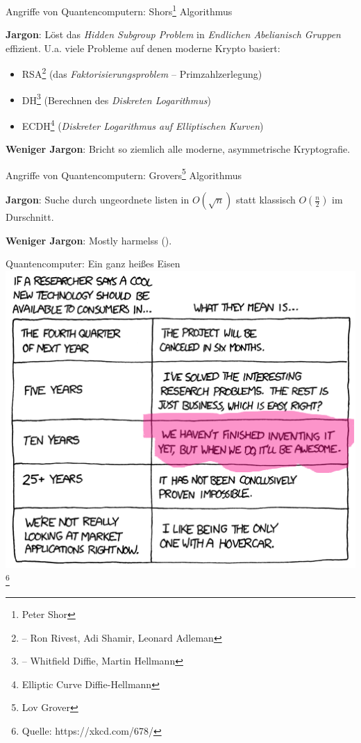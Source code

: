 \documentclass{rosenpass-beamer}
\begin{document}
\begin{frame}{Angriffe von Quantencomputern: Shors\footnote{Peter Shor} Algorithmus}

\textbf{Jargon}: Löst das \emph{Hidden Subgroup Problem} in \emph{Endlichen Abelianisch Gruppen} effizient. U.a. viele Probleme auf denen moderne Krypto basiert:

\vspace{5mm}

\begin{itemize}
    \item RSA\footnote{ -- Ron Rivest, Adi Shamir, Leonard Adleman} (das \emph{Faktorisierungsproblem} – Primzahlzerlegung)
    \item DH\footnote{ -- Whitfield Diffie, Martin Hellmann} (Berechnen des \emph{Diskreten Logarithmus})
    \item ECDH\footnote{Elliptic Curve Diffie-Hellmann} (\emph{Diskreter Logarithmus auf Elliptischen Kurven})
\end{itemize}

\vspace{5mm}

\textbf{Weniger Jargon}: Bricht so ziemlich alle moderne, asymmetrische Kryptografie.

\end{frame}

\begin{frame}{Angriffe von Quantencomputern: Grovers\footnote{Lov Grover} Algorithmus}

\textbf{Jargon}: Suche durch ungeordnete listen in $O(\sqrt{n})$ statt klassisch $O(\frac{n}{2})$ im Durschnitt.

\vspace{5mm}


\textbf{Weniger Jargon}: Mostly harmelss ().

\end{frame}

\begin{frame}{Quantencomputer: Ein ganz heißes Eisen}
  \includegraphics[height=.6\textheight]{assets/xkcd_678.png}
  \footnote{Quelle: https://xkcd.com/678/}
\end{frame}
\end{document}
